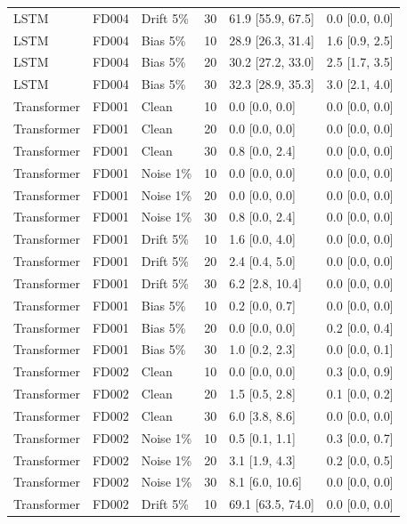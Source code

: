 \documentclass[10pt,a4paper]{article}
\begin{document}
\begin{center}
\begin{longtable}{lllcll}
LSTM & FD004 & Drift 5\% & 30 & 61.9 [55.9, 67.5] & 0.0 [0.0, 0.0]  \\
LSTM & FD004 & Bias 5\% & 10 & 28.9 [26.3, 31.4] & 1.6 [0.9, 2.5]  \\
LSTM & FD004 & Bias 5\% & 20 & 30.2 [27.2, 33.0] & 2.5 [1.7, 3.5]  \\
LSTM & FD004 & Bias 5\% & 30 & 32.3 [28.9, 35.3] & 3.0 [2.1, 4.0]  \\
Transformer & FD001 & Clean & 10 & 0.0 [0.0, 0.0] & 0.0 [0.0, 0.0]  \\
Transformer & FD001 & Clean & 20 & 0.0 [0.0, 0.0] & 0.0 [0.0, 0.0]  \\
Transformer & FD001 & Clean & 30 & 0.8 [0.0, 2.4] & 0.0 [0.0, 0.0]  \\
Transformer & FD001 & Noise 1\% & 10 & 0.0 [0.0, 0.0] & 0.0 [0.0, 0.0]  \\
Transformer & FD001 & Noise 1\% & 20 & 0.0 [0.0, 0.0] & 0.0 [0.0, 0.0]  \\
Transformer & FD001 & Noise 1\% & 30 & 0.8 [0.0, 2.4] & 0.0 [0.0, 0.0]  \\
Transformer & FD001 & Drift 5\% & 10 & 1.6 [0.0, 4.0] & 0.0 [0.0, 0.0]  \\
Transformer & FD001 & Drift 5\% & 20 & 2.4 [0.4, 5.0] & 0.0 [0.0, 0.0]  \\
Transformer & FD001 & Drift 5\% & 30 & 6.2 [2.8, 10.4] & 0.0 [0.0, 0.0]  \\
Transformer & FD001 & Bias 5\% & 10 & 0.2 [0.0, 0.7] & 0.0 [0.0, 0.0]  \\
Transformer & FD001 & Bias 5\% & 20 & 0.0 [0.0, 0.0] & 0.2 [0.0, 0.4]  \\
Transformer & FD001 & Bias 5\% & 30 & 1.0 [0.2, 2.3] & 0.0 [0.0, 0.1]  \\
Transformer & FD002 & Clean & 10 & 0.0 [0.0, 0.0] & 0.3 [0.0, 0.9]  \\
Transformer & FD002 & Clean & 20 & 1.5 [0.5, 2.8] & 0.1 [0.0, 0.2]  \\
Transformer & FD002 & Clean & 30 & 6.0 [3.8, 8.6] & 0.0 [0.0, 0.0]  \\
Transformer & FD002 & Noise 1\% & 10 & 0.5 [0.1, 1.1] & 0.3 [0.0, 0.7]  \\
Transformer & FD002 & Noise 1\% & 20 & 3.1 [1.9, 4.3] & 0.2 [0.0, 0.5]  \\
Transformer & FD002 & Noise 1\% & 30 & 8.1 [6.0, 10.6] & 0.0 [0.0, 0.0]  \\
Transformer & FD002 & Drift 5\% & 10 & 69.1 [63.5, 74.0] & 0.0 [0.0, 0.0]  \\

\end{longtable}
\end{center}
\end{document}
